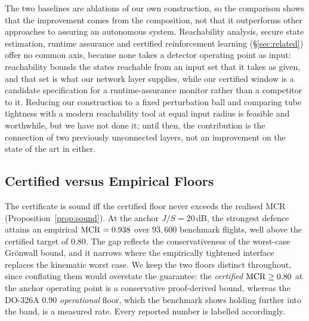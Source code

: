 The two baselines are ablations of our own construction, so the comparison
shows that the improvement comes from the composition, not that it outperforms
other approaches to assuring an autonomous system. Reachability analysis,
secure state estimation, runtime assurance and certified reinforcement learning
(\S\ref{sec:related}) offer no common axis, because none takes a detector
operating point as input: reachability bounds the states reachable from an
input set that it takes as given, and that set is what our network layer
supplies, while our certified window is a candidate specification for a
runtime-assurance monitor rather than a competitor to it. Reducing our
construction to a fixed perturbation ball and comparing tube tightness with a
modern reachability tool at equal input radius is feasible and worthwhile, but
we have not done it; until then, the contribution is the connection of two
previously unconnected layers, not an improvement on the state of the art in
either.

\subsection{Certified versus Empirical Floors}
The certificate is sound iff the certified floor never exceeds the realised MCR
(Proposition~\ref{prop:sound}). At the anchor $J/S=20$\,dB, the strongest
defence attains an empirical $\mathrm{MCR}=0.938$ over $93{,}600$ benchmark flights,
well above the certified target of $0.80$. The gap reflects the
conservativeness of the worst-case Gr\"onwall bound, and it narrows where the
empirically tightened interface replaces the kinematic worst case. We keep the
two floors distinct throughout, since conflating them would overstate the
guarantee: the \emph{certified} $\mathrm{MCR}\ge0.80$ at the anchor operating point is
a conservative proof-derived bound, whereas the DO-326A $0.90$
\emph{operational} floor, which the benchmark shows holding further into the
band, is a measured rate. Every reported number is labelled accordingly.

\begin{table}[t]
\centering
\caption{A representative cross-layer pairing, in which a detector-evading
time-delay attack still induces measurable navigation staleness. Values are
from the released artifact (harness simulation; $\gamma$ at its per-sample
supremum; benchmark MCR).}
\label{tab:pairing}
\scriptsize
\renewcommand{\arraystretch}{1.05}

\end{table}

